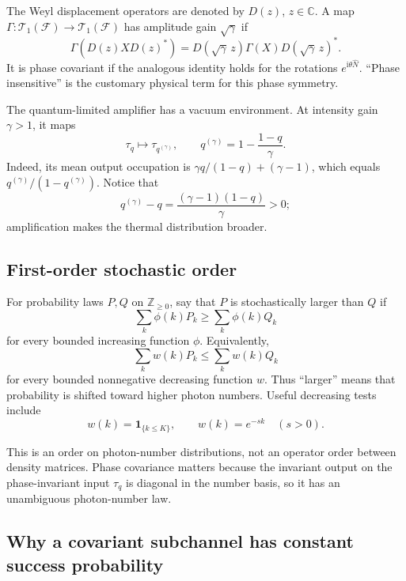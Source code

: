 \documentclass[11pt]{article}
\newcommand{\F}{\mathcal F}
\newcommand{\T}{\mathcal T_1}
\begin{document}
The Weyl displacement operators are denoted by $D(z)$, $z\in\mathbb C$.
A map $\Gamma:\T(\F)\to\T(\F)$ has amplitude gain $\sqrt\gamma$ if
\begin{equation}\label{eq:disp-cov}
  \Gamma\!\left(D(z)XD(z)^*\right)
  =D(\sqrt\gamma\,z)\Gamma(X)D(\sqrt\gamma\,z)^*.
\end{equation}
It is phase covariant if the analogous identity holds for the rotations
$e^{\mathrm i\theta\widehat N}$.  ``Phase insensitive'' is the customary
physical term for this phase symmetry.

The quantum-limited amplifier has a vacuum environment.  At intensity gain
$\gamma>1$, it maps
\begin{equation}\label{eq:thermal-output}
  \tau_q\longmapsto\tau_{q^{(\gamma)}},
  \qquad
  q^{(\gamma)}=1-\frac{1-q}{\gamma}.
\end{equation}
Indeed, its mean output occupation is
$\gamma q/(1-q)+(\gamma-1)$, which equals
$q^{(\gamma)}/(1-q^{(\gamma)})$.  Notice that
\begin{equation}\label{eq:q-order}
  q^{(\gamma)}-q
  =\frac{(\gamma-1)(1-q)}{\gamma}>0;
\end{equation}
amplification makes the thermal distribution broader.

\subsection{First-order stochastic order}

For probability laws $P,Q$ on $\mathbb Z_{\geq0}$, say that $P$ is
stochastically larger than $Q$ if
\[
  \sum_k\phi(k)P_k\geq\sum_k\phi(k)Q_k
\]
for every bounded increasing function $\phi$.  Equivalently,
\begin{equation}\label{eq:decreasing-test}
  \sum_k w(k)P_k\leq\sum_k w(k)Q_k
\end{equation}
for every bounded nonnegative decreasing function $w$.
Thus ``larger'' means that probability is shifted toward higher photon
numbers.  Useful decreasing tests include
\[
  w(k)=\boldsymbol 1_{\{k\leq K\}},
  \qquad w(k)=e^{-sk}\quad(s>0).
\]

This is an order on photon-number distributions, not an operator order
between density matrices.  Phase covariance matters because the invariant
output on the phase-invariant input $\tau_q$ is diagonal in the number basis,
so it has an unambiguous photon-number law.

\subsection{Why a covariant subchannel has constant success probability}
\end{document}
